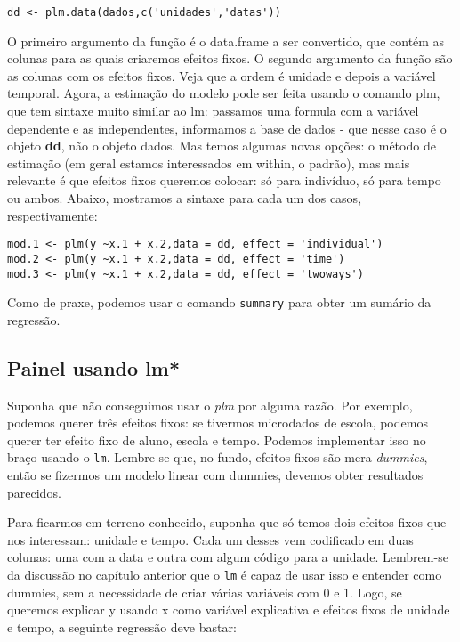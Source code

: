 \documentclass[]{book}
\begin{document}
\begin{verbatim}
dd <- plm.data(dados,c('unidades','datas'))
\end{verbatim}

O primeiro argumento da função é o data.frame a ser convertido, que
contém as colunas para as quais criaremos efeitos fixos. O segundo
argumento da função são as colunas com os efeitos fixos. Veja que a
ordem é unidade e depois a variável temporal. Agora, a estimação do
modelo pode ser feita usando o comando plm, que tem sintaxe muito
similar ao lm: passamos uma formula com a variável dependente e as
independentes, informamos a base de dados - que nesse caso é o objeto
\textbf{dd}, não o objeto dados. Mas temos algumas novas opções: o
método de estimação (em geral estamos interessados em within, o padrão),
mas mais relevante é que efeitos fixos queremos colocar: só para
indivíduo, só para tempo ou ambos. Abaixo, mostramos a sintaxe para cada
um dos casos, respectivamente:

\begin{verbatim}
mod.1 <- plm(y ~x.1 + x.2,data = dd, effect = 'individual')
mod.2 <- plm(y ~x.1 + x.2,data = dd, effect = 'time')
mod.3 <- plm(y ~x.1 + x.2,data = dd, effect = 'twoways')
\end{verbatim}

Como de praxe, podemos usar o comando \texttt{summary} para obter um
sumário da regressão.

\subsection{Painel usando lm*}\label{painel-usando-lm}

Suponha que não conseguimos usar o \emph{plm} por alguma razão. Por
exemplo, podemos querer três efeitos fixos: se tivermos microdados de
escola, podemos querer ter efeito fixo de aluno, escola e tempo. Podemos
implementar isso no braço usando o \texttt{lm}. Lembre-se que, no fundo,
efeitos fixos são mera \emph{dummies}, então se fizermos um modelo
linear com dummies, devemos obter resultados parecidos.

Para ficarmos em terreno conhecido, suponha que só temos dois efeitos
fixos que nos interessam: unidade e tempo. Cada um desses vem codificado
em duas colunas: uma com a data e outra com algum código para a unidade.
Lembrem-se da discussão no capítulo anterior que o \texttt{lm} é capaz
de usar isso e entender como dummies, sem a necessidade de criar várias
variáveis com 0 e 1. Logo, se queremos explicar y usando x como variável
explicativa e efeitos fixos de unidade e tempo, a seguinte regressão
deve bastar:
\end{document}
